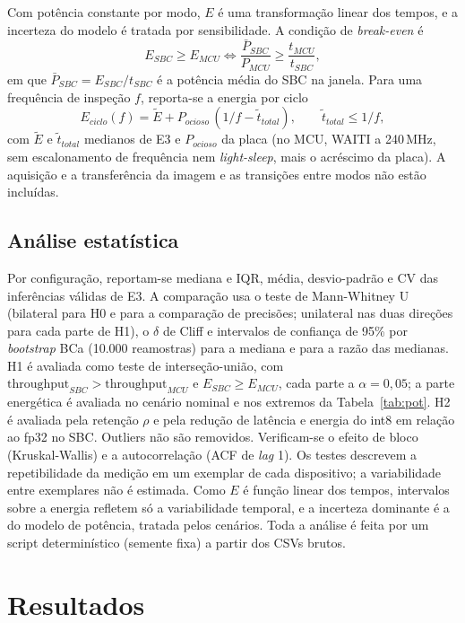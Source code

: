 \documentclass[11pt,a4paper]{article}
\begin{document}
Com potência constante por modo, $E$ é uma transformação linear dos tempos, e a incerteza do modelo é tratada
por sensibilidade. A condição de \emph{break-even} é
\begin{equation}
E_{SBC}\geq E_{MCU}\iff \frac{\bar P_{SBC}}{P_{MCU}}\geq\frac{t_{MCU}}{t_{SBC}},
\end{equation}
em que $\bar P_{SBC}=E_{SBC}/t_{SBC}$ é a potência média do SBC na janela. Para uma frequência de inspeção $f$,
reporta-se a energia por ciclo
\begin{equation}
E_{ciclo}(f)=\tilde E+P_{ocioso}\,(1/f-\tilde t_{total}),\qquad \tilde t_{total}\leq 1/f,
\end{equation}
com $\tilde E$ e $\tilde t_{total}$ medianos de E3 e $P_{ocioso}$ da placa (no MCU, WAITI a 240\,MHz, sem
escalonamento de frequência nem \emph{light-sleep}, mais o acréscimo da placa). A aquisição e a transferência da
imagem e as transições entre modos não estão incluídas.

\subsection{Análise estatística}
Por configuração, reportam-se mediana e IQR, média, desvio-padrão e CV das inferências válidas de E3. A
comparação usa o teste de Mann-Whitney U \cite{mann1947test} (bilateral para H0 e para a comparação de
precisões; unilateral nas duas direções para cada parte de H1), o $\delta$ de Cliff \cite{cliff1993dominance} e intervalos de confiança de 95\% por \emph{bootstrap} BCa
(10.000 reamostras) \cite{efron1993bootstrap} para a mediana e para a razão das medianas. H1 é avaliada como
teste de interseção-união, com $\text{throughput}_{SBC}>\text{throughput}_{MCU}$ e $E_{SBC}\geq E_{MCU}$, cada
parte a $\alpha=0{,}05$; a parte energética é avaliada no cenário nominal e nos extremos da
Tabela~\ref{tab:pot}. H2 é avaliada pela retenção $\rho$ e pela redução de latência e energia do int8 em relação
ao fp32 no SBC. Outliers não são removidos. Verificam-se o efeito de bloco (Kruskal-Wallis) e a autocorrelação
(ACF de \emph{lag} 1). Os testes descrevem a repetibilidade da medição em um exemplar de cada dispositivo; a
variabilidade entre exemplares não é estimada. Como $E$ é função linear dos tempos, intervalos sobre a energia
refletem só a variabilidade temporal, e a incerteza dominante é a do modelo de potência, tratada pelos cenários.
Toda a análise é feita por um script determinístico (semente fixa) a partir dos CSVs brutos.

\section{Resultados}\label{sec:resultados}
\end{document}
